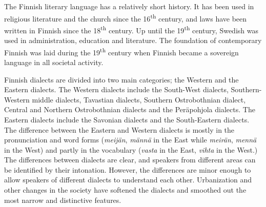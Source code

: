 \documentclass[]{../../metanetpaper}
\begin{document}
\begin{Parallel}[c]{77mm}{77mm}
{The Finnish literary language has a relatively short history. It has been used
in religious literature and the church since the 16\textsuperscript{th} century, and laws have
been written in Finnish since the 18\textsuperscript{th} century. Up until the 19\textsuperscript{th} century,
Swedish was used in administration, education and literature. The foundation of
contemporary Finnish was laid during the 19\textsuperscript{th} century when Finnish became a
sovereign language in all societal activity.

Finnish dialects are divided into two main categories; the Western and the
Eastern dialects. The Western dialects include the South-West dialects,
Southern-Western middle dialects, Tavastian dialects, Southern Ostrobothnian
dialect, Central and Northern Ostrobothnian dialects and the Peräpohjola
dialects. The Eastern dialects include the Savonian dialects and the
South-Eastern dialects. The difference between the Eastern and Western dialects
is mostly in the pronunciation and word forms
 (\textit{\foreignlanguage{finnish}{\textit{meijän}}},
  \textit{\foreignlanguage{finnish}{\textit{männä}}} in the East while
  \textit{\foreignlanguage{finnish}{\textit{meirän}}},
  \textit{\foreignlanguage{finnish}{\textit{mennä}}} in the West)
and partly in the vocabulary
 (\textit{\foreignlanguage{finnish}{\textit{vasta}}} in the East,
  \textit{\foreignlanguage{finnish}{\textit{vihta}}} in the West.)
The differences between dialects are clear, and speakers
from different areas can be identified by their intonation. However, the
differences are minor enough to allow speakers of different dialects to
understand each other. Urbanization and other changes in the society have
softened the dialects and smoothed out the most narrow and distinctive
features.
}

\ParallelPar


\end{Parallel}
\end{document}
